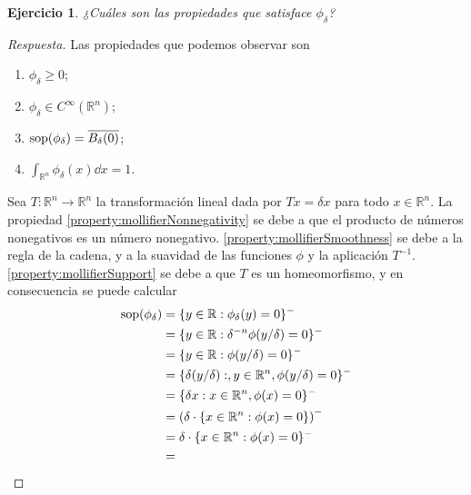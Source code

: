\documentclass{article}
\newcommand{\realNumbers}{\mathbb{R}}
\newtheorem{exercise}{Ejercicio}
\DeclareMathOperator{\support}{\textnormal{sop}}
\theoremstyle{remark}
\begin{document}
  \begin{exercise}
    \label{exercise:deltaMollifierProperties}
    ¿Cuáles son las propiedades que satisface \(\phi_{\delta}\)?
  \end{exercise}
  \begin{proof}[Respuesta]
    Las propiedades que podemos observar son
    \begin{enumerate}[label=\alph*)]
      \item 
        \label{property:mollifierNonnegativity}
        \(\phi_{\delta} \geq 0\);
      \item 
        \label{property:mollifierSmoothness}
        \(\phi_{\delta} \in C^{\infty}(\realNumbers^n)\);
      \item 
        \label{property:mollifierSupport}
        \(\support(\phi_{\delta}) = \overline{B_{\delta}(0)}\);
      \item 
        \label{property:mollifierIntegral}
        \(\int_{\realNumbers^n} \phi_{\delta}(x) \dd x = 1\).
    \end{enumerate}
    Sea \(T : \realNumbers^n \rightarrow \realNumbers^n\) la transformación lineal dada por \(T x = \delta x\) para todo \(x \in \realNumbers^n\).
    La propiedad
    \ref{property:mollifierNonnegativity}
    se debe a que el producto de números nonegativos es un número nonegativo.
    \ref{property:mollifierSmoothness}
    se debe a la regla de la cadena, y a la suavidad de las funciones \(\phi\) y la aplicación \(T^{- 1}\).
    \ref{property:mollifierSupport}
    se debe a que \(T\) es un homeomorfismo, y en consecuencia se puede calcular
    \begin{align}
      \support(\phi_{\delta})
      &=
      \{y \in \realNumbers : \phi_{\delta}(y) = 0\}^-
      \\
      &=
      \{y \in \realNumbers : \delta^{- n} \phi(y / \delta) = 0\}^-
      \\
      &=
      \{y \in \realNumbers : \phi(y / \delta) = 0\}^-
      \\
      &=
      \{\delta (y / \delta) :, y \in \realNumbers^n, \phi(y / \delta) = 0\}^-
      \\
      &=
      \{\delta x : x \in \realNumbers^n, \phi(x) = 0\}^-
      \\
      &=
      \left(
        \delta \cdot
        \{x \in \realNumbers^n: \phi(x) = 0\}
      \right)^-
      \\
      &=
      \delta \cdot 
      \{x \in \realNumbers^n: \phi(x) = 0\}^-
      \\
      &=

\end{align}
\end{proof}
\end{document}
